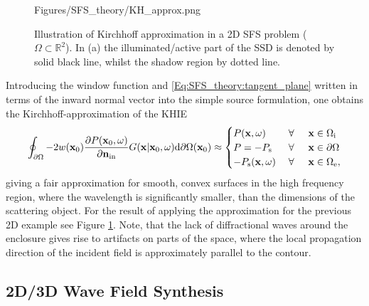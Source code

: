 \begin{figure}
	\centering
	\begin{overpic}[width = 1\columnwidth]{Figures/SFS_theory/KH_approx.png}
	\end{overpic}
\caption{Illustration of Kirchhoff approximation in a 2D SFS problem ($\Omega \subset \mathbb{R}^2$). In (a) the illuminated/active part of the SSD is denoted by solid black line, whilst the shadow region by dotted line.}
	\label{Fig:Theory:KH_approximation}
\end{figure}
%
Introducing the window function and \eqref{Eq:SFS_theory:tangent_plane} written in terms of the inward normal vector into the simple source formulation, one obtains the Kirchhoff-approximation of the KHIE
\begin{equation}
\oint_{\partial \Omega} 
- 2w(\mathbf{x}_0)\frac{\partial P(\mathbf{x}_0,\omega)}{\partial \mathbf{n}_{\mathrm{in}}} 
G(\mathbf{x}|\mathbf{x}_0,\omega) 
\mathrm{d} \partial \Omega ( \mathbf{x}_0)
\approx
\begin{cases} 
P(\mathbf{x},\omega)     & \hspace{1mm} \forall \hspace{5mm}   \mathbf{x} \in \Omega_{\mathrm{i}} \\
P=-P_{\mathrm{s}}  & \hspace{1mm} \forall \hspace{5mm}         \mathbf{x} \in \partial \Omega  \\
-P_{\mathrm{s}}(\mathbf{x},\omega)    & \hspace{1mm} \forall \hspace{5mm}  \mathbf{x} \in \Omega_{\mathrm{e}},
\end{cases}
\label{Eq:SFS_theory:Kirchhoff_appr}
\end{equation}
giving a fair approximation for smooth, convex surfaces in the high frequency region, where the wavelength is significantly smaller, than the dimensions of the scattering object. For the result of applying the approximation for the previous 2D example see Figure \ref{Fig:Theory:KH_approximation}. Note, that the lack of diffractional waves around the enclosure gives rise to artifacts on parts of the space, where the local propagation direction of the incident field is approximately parallel to the contour.

\subsection{2D/3D Wave Field Synthesis}


